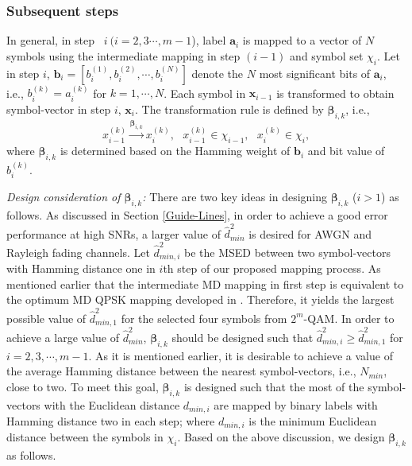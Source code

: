 \documentclass[12pt, draftclsnofoot, onecolumn]{IEEEtran}
\newcommand{\mb}[1]{\boldsymbol{#1}}
\begin{document}




\subsubsection{Subsequent steps} 
 In general, in step ~$i~ ( i=2,3\cdots,  m-1$),  label ${\mb a}_{i}$ is mapped to a vector of $N$ symbols   using the intermediate  mapping in  step $(i-1)$ and symbol set $\chi_i$. \color{black}     Let in step $i$, ${\mb b}_{i}=[b^{(1)}_{i}, b^{(2)}_{i}, \cdots, b^{(N)}_{i}]$ denote the $N$  most significant \color{black} bits of $\mb{a}_{i}$, i.e., $b_{i}^{(k)} = a_{i}^{(k)}$ for $k = 1, \cdots, N$. Each symbol in  $\mb{x}_{i-1}$ is transformed to obtain  symbol-vector in step $i$, $\mb{x}_{i}$.   The transformation rule is defined by   $\mb{\beta}_{i,k}$, i.e., 
 \begin{equation}
\label{convert2}
x_{i-1}^{(k)}\xrightarrow {\mb{\beta}_{i,k}}x_{i}^{(k)}, ~~~x_{i-1}^{(k)}\in \chi_{i-1},~~~x_{i}^{(k)} \in \chi_{i},
\end{equation}
 where  $\mb{\beta}_{i,k}$ %
 is determined based on  the Hamming weight of ${\mb b}_{i}$ and bit value of  $b_{i}^{(k)}$. 
 
 \emph{ Design consideration   of ${\mb \beta}_{i,k}$:}
 There are two key ideas in designing $\mb{\beta}_{i,k}$ ($i>1$) as follows. As discussed in Section \ref{Guide-Lines}, in order to achieve a good error performance at high SNRs, a larger value of $\hat{d}_{min}^{2}$ is desired for AWGN and Rayleigh fading channels. Let $\hat{d}_{min,i}^{2}$ be the MSED between two symbol-vectors with Hamming distance one in  $i$th step of our  proposed mapping process. As mentioned earlier that the  intermediate  MD mapping in  first step is  equivalent to the optimum MD QPSK mapping developed in \cite{MD-BQPSK-Simoen}. Therefore, it  yields the largest possible value of  $\hat{d}_{min,1}^{2}$ for the selected four symbols from $2^m$-QAM. In order to  achieve a large  value of  $\hat{d}_{min}^{2}$,  $\mb{\beta}_{i,k}$ should be designed such that  $\hat{d}_{min,i}^{2} \geq \hat{d}_{min,1}^{2}$ for $i=2,3,\cdots, m-1$. As it is mentioned earlier, it is desirable to achieve a  value of  the average Hamming distance between the nearest symbol-vectors, i.e., $N_{min}$, close to two. To meet this goal,  $\mb{\beta}_{i,k}$ is designed such that  the most of the symbol-vectors with the Euclidean distance $d_{min,i}$ are mapped by binary labels with Hamming distance two in each step;  where $d_{min,i}$ is the minimum Euclidean distance between the symbols in $\chi_{i}$\color{black}. 
Based on the above discussion, we design $\mb{\beta}_{i,k}$ as follows. 
 
\end{document}
